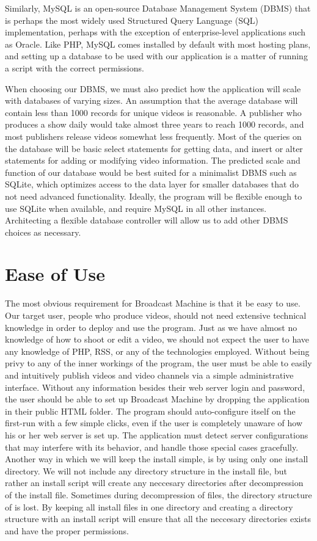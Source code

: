 \documentclass[a4paper,12pt]{report}
\begin{document}
Similarly, MySQL is an open-source Database Management System (DBMS) that is perhaps the most widely used Structured Query Language (SQL) implementation, perhaps with the exception of enterprise-level applications such as Oracle. 
Like PHP, MySQL comes installed by default with most hosting plans, and setting up a database to be used with our application is a matter of running a script with the correct permissions. 


When choosing our DBMS, we must also predict how the application will scale with databases of varying sizes. 
An assumption that the average database will contain less than 1000 records for unique videos is reasonable. 
A publisher who produces a show daily would take almost three years to reach 1000 records, and most publishers release videos somewhat less frequently. 
Most of the queries on the database will be basic select statements for getting data, and insert or alter statements for adding or modifying video information. 
The predicted scale and function of our database would be best suited for a minimalist DBMS such as SQLite, which optimizes access to the data layer for smaller databases that do not need advanced functionality. 
Ideally, the program will be flexible enough to use SQLite when available, and require MySQL in all other instances. 
Architecting a flexible database controller will allow us to add other DBMS choices as necessary. 


\section{Ease of Use}
The most obvious requirement for Broadcast Machine is that it be easy to use. 
Our target user, people who produce videos, should not need extensive technical knowledge in order to deploy and use the program. 
Just as we have almost no knowledge of how to shoot or edit a video, we should not expect the user to have any knowledge of PHP, RSS, or any of the technologies employed. 
Without being privy to any of the inner workings of the program, the user must be able to easily and intuitively publish videos and video channels via a simple administrative interface. 
Without any information besides their web server login and password, the user should be able to set up Broadcast Machine by dropping the application in their public HTML folder. 
The program should auto-configure itself on the first-run with a few simple clicks, even if the user is completely unaware of how his or her web server is set up. 
The application must detect server configurations that may interfere with its behavior, and handle those special cases gracefully. 
Another way in which we will keep the install simple, is by using only one install directory. 
We will not include any directory structure in the install file, but rather an install script will create any neccesary directories after decompression of the install file. 
Sometimes during decompression of files, the directory structure of is lost. 
By keeping all install files in one directory and creating a directory structure with an install script will ensure that all the neccesary directories exists and have the proper permissions. 
\end{document}
